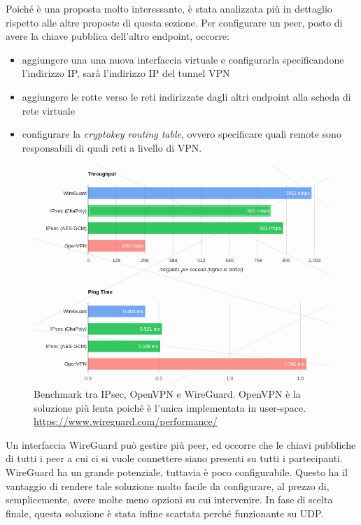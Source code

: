 	      
Poiché è una proposta molto interessante, è stata analizzata più in dettaglio rispetto
alle altre proposte di questa sezione. Per configurare un peer,
posto di avere la chiave pubblica dell'altro endpoint, occorre:
\begin{itemize}
	\item aggiungere una una nuova interfaccia virtuale e configurarla specificandone
	      l'indirizzo IP, sarà l'indirizzo IP del tunnel VPN
	\item aggiungere le rotte verso le reti indirizzate dagli altri endpoint alla scheda
	      di rete virtuale
	\item configurare la \textit{cryptokey routing table}, ovvero specificare
	      quali remote sono responsabili di quali reti a livello di VPN\cite{wireguard-quick-start}.
\end{itemize}
\begin{figure}
	\includegraphics[scale=0.45]{img/wireguard_performance}
	\caption[Benchmark tra IPsec, OpenVPN e WireGuard]{Benchmark tra IPsec, OpenVPN e WireGuard.
		OpenVPN è la soluzione più lenta poiché è l'unica implementata in user-space.
		\url{https://www.wireguard.com/performance/}}
	\label{fig:wireguard-performance}
\end{figure}
Un interfaccia WireGuard può gestire più peer, ed occorre che le chiavi pubbliche di tutti
i peer a cui ci si vuole connettere siano presenti su tutti i partecipanti.
WireGuard ha un grande potenziale, tuttavia è poco configurabile. Questo ha il vantaggio
di rendere tale soluzione molto facile da configurare, al prezzo di, semplicemente, avere
molte meno opzioni su cui intervenire. In fase di scelta
finale, questa soluzione è stata infine scartata perché funzionante su UDP.
	      
